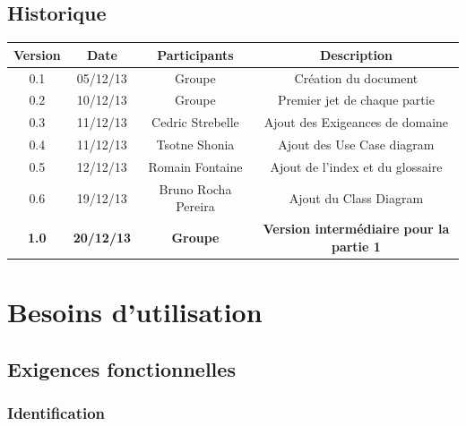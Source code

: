 \documentclass[a4paper]{article}
\begin{document}
\printglossary[numberedsection]
\subsection{Historique}
\begin{tabular}{|c|c|c|c|}
	\hline
	Version & Date & Participants & Description\\
	\hline
	0.1 & 05/12/13 & Groupe & Création du document\\
	\hline
	0.2 & 10/12/13 & Groupe & Premier jet de chaque partie\\
	\hline
	0.3 & 11/12/13 & Cedric Strebelle & Ajout des Exigeances de domaine\\
	\hline
	0.4 & 11/12/13 & Tsotne Shonia & Ajout des Use Case diagram\\
	\hline
	0.5 & 12/12/13 & Romain Fontaine & Ajout de l'index et du glossaire\\
	\hline
	0.6 & 19/12/13 & Bruno Rocha Pereira & Ajout du Class Diagram\\
	\hline
	\textbf{1.0} & \textbf{20/12/13} & \textbf{Groupe} & \textbf{Version intermédiaire pour la partie 1}\\
	\hline
	
\end{tabular}

\section{Besoins d'utilisation}
\subsection{Exigences fonctionnelles}

\subsubsection{Identification}
\end{document}
